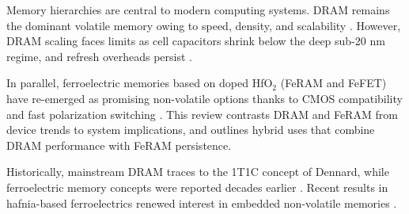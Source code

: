 Memory hierarchies are central to modern computing systems. DRAM remains the dominant volatile memory owing to speed, density, and scalability \cite{choi2022,kim2021_dram}. However, DRAM scaling faces limits as cell capacitors shrink below the deep sub-20 nm regime, and refresh overheads persist \cite{kim2021_dram,iedm2023_dram}.

In parallel, ferroelectric memories based on doped HfO$_2$ (FeRAM and FeFET) have re-emerged as promising non-volatile options thanks to CMOS compatibility and fast polarization switching \cite{boscke2011,mueller2012,noheda2023}. This review contrasts DRAM and FeRAM from device trends to system implications, and outlines hybrid uses that combine DRAM performance with FeRAM persistence.

Historically, mainstream DRAM traces to the 1T1C concept of Dennard, while ferroelectric memory concepts were reported decades earlier \cite{scott1998}. Recent results in hafnia-based ferroelectrics renewed interest in embedded non-volatile memories \cite{boscke2011,mueller2012}.
